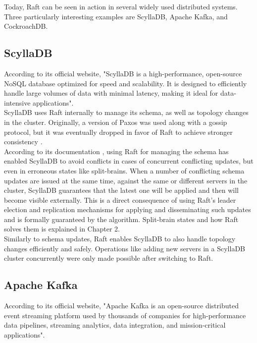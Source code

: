 Today, Raft can be seen in action in several widely used distributed systems. Three particularly interesting examples are ScyllaDB, Apache Kafka, and CockroachDB.

\subsection{ScyllaDB}

According to its official website, "ScyllaDB is a high-performance, open-source NoSQL database optimized for speed and scalability. It is designed to efficiently handle large volumes of data with minimal latency, making it ideal for data-intensive applications"\cite{scylla}.\\

ScyllaDB uses Raft internally to manage its schema, as well as topology changes in the cluster. Originally, a version of Paxos was used along with a gossip protocol, but it was eventually dropped in favor of Raft to achieve stronger consistency \cite{scylla-raft}.\\

According to its documentation \cite{scylla-raft}, using Raft for managing the schema has enabled ScyllaDB to avoid conflicts in cases of concurrent conflicting updates, but even in erroneous states like split-brains. When a number of conflicting schema updates are issued at the same time, against the same or different servers in the cluster, ScyllaDB guarantees that the latest one will be applied and then will become visible externally. This is a direct consequence of using Raft's leader election and replication mechanisms for applying and disseminating such updates and is formally guaranteed by the algorithm. Split-brain states and how Raft solves them is explained in Chapter 2.\\

Similarly to schema updates, Raft enables ScyllaDB to also handle topology changes efficiently and safely. Operations like adding new servers in a ScyllaDB cluster concurrently were only made possible after switching to Raft.

\subsection{Apache Kafka}

According to its official website, "Apache Kafka is an open-source distributed event streaming platform used by thousands of companies for high-performance data pipelines, streaming analytics, data integration, and mission-critical applications"\cite{kafka}.\\

